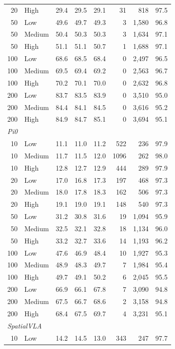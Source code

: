 \begin{table}[t]
{\begin{tabular}{rlrrrrrr}
20 & High & 29.4 & 29.5 & 29.1 & 31 & 818 & 97.5 \\
50 & Low & 49.6 & 49.7 & 49.3 & 3 & 1,580 & 96.8 \\
50 & Medium & 50.4 & 50.3 & 50.3 & 3 & 1,634 & 97.1 \\
50 & High & 51.1 & 51.1 & 50.7 & 1 & 1,688 & 97.1 \\
100 & Low & 68.6 & 68.5 & 68.4 & 0 & 2,497 & 96.5 \\
100 & Medium & 69.5 & 69.4 & 69.2 & 0 & 2,563 & 96.7 \\
100 & High & 70.2 & 70.1 & 70.0 & 0 & 2,632 & 96.8 \\
200 & Low & 83.7 & 83.5 & 83.9 & 0 & 3,510 & 95.0 \\
200 & Medium & 84.4 & 84.1 & 84.5 & 0 & 3,616 & 95.2 \\
200 & High & 84.9 & 84.7 & 85.1 & 0 & 3,694 & 95.1 \\
\midrule
\multicolumn{8}{l}{\textit{Pi0}} \\
10 & Low & 11.1 & 11.0 & 11.2 & 522 & 236 & 97.9 \\
10 & Medium & 11.7 & 11.5 & 12.0 & 1096 & 262 & 98.0 \\
10 & High & 12.8 & 12.7 & 12.9 & 444 & 289 & 97.9 \\
20 & Low & 17.0 & 16.8 & 17.3 & 197 & 468 & 97.3 \\
20 & Medium & 18.0 & 17.8 & 18.3 & 162 & 506 & 97.3 \\
20 & High & 19.1 & 19.0 & 19.1 & 148 & 540 & 97.3 \\
50 & Low & 31.2 & 30.8 & 31.6 & 19 & 1,094 & 95.9 \\
50 & Medium & 32.5 & 32.1 & 32.8 & 18 & 1,134 & 96.0 \\
50 & High & 33.2 & 32.7 & 33.6 & 14 & 1,193 & 96.2 \\
100 & Low & 47.6 & 46.9 & 48.4 & 10 & 1,927 & 95.3 \\
100 & Medium & 48.9 & 48.3 & 49.7 & 7 & 1,984 & 95.4 \\
100 & High & 49.7 & 49.1 & 50.2 & 6 & 2,045 & 95.5 \\
200 & Low & 66.9 & 66.1 & 67.8 & 7 & 3,090 & 94.8 \\
200 & Medium & 67.5 & 66.7 & 68.6 & 2 & 3,158 & 94.8 \\
200 & High & 68.4 & 67.5 & 69.7 & 4 & 3,231 & 95.1 \\
\midrule
\multicolumn{8}{l}{\textit{SpatialVLA}} \\
10 & Low & 14.2 & 14.5 & 13.0 & 343 & 247 & 97.7 \\

\end{tabular}}
\end{table}
